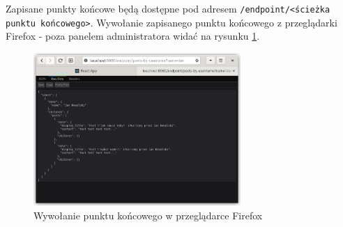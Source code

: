 Zapisane punkty końcowe będą dostępne pod adresem \verb|/endpoint/<ścieżka punktu końcowego>|.
Wywołanie zapisanego punktu końcowego z przeglądarki Firefox - poza panelem
administratora widać na rysunku \ref{endpointFirefoxFigure}.

\begin{figure}[h]
    \centering
    \includegraphics[width=0.7\textwidth]{./img/endpoint_firefox.png}
    \caption{Wywołanie punktu końcowego w przeglądarce Firefox}
    \label{endpointFirefoxFigure}
\end{figure}
